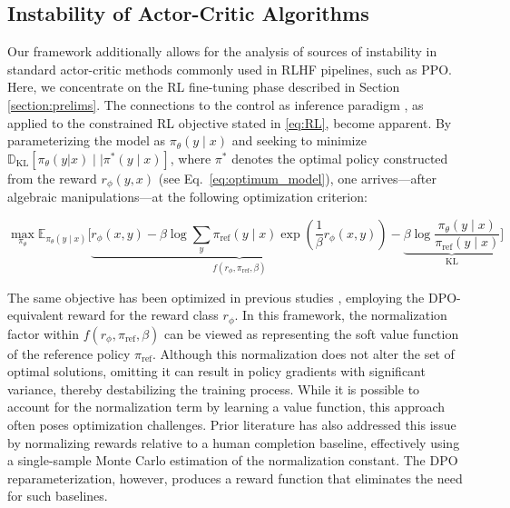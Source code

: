 \subsection{Instability of Actor-Critic Algorithms} Our framework additionally allows for the analysis of sources of instability in standard actor-critic methods commonly used in RLHF pipelines, such as PPO. Here, we concentrate on the RL fine-tuning phase described in Section \ref{section:prelims}. The connections to the control as inference paradigm \cite{levine2018reinforcement}, as applied to the constrained RL objective stated in \ref{eq:RL}, become apparent. By parameterizing the model as $\pi_{\theta}(y\mid x)$ and seeking to minimize $\mathbb{D}_{\text{KL}}[\pi_{\theta}(y|x) \mid \mid \pi^*(y\mid x)]$, where $\pi^*$ denotes the optimal policy constructed from the reward $r_{\phi}(y, x)$ (see Eq.~\ref{eq:optimum_model}), one arrives—after algebraic manipulations—at the following optimization criterion:

\begin{equation}\label{eq:AC}
    \max_{\pi_{\theta}}\mathbb{E}_{\pi_{\theta}(y\mid x)}\bigg[\underbrace{r_{\phi}(x, y) -\beta\log\sum_{y}\pi_\text{ref}(y\mid x)\exp\left(\frac{1}{\beta}r_{\phi}(x, y)\right)}_{f(r_{\phi}, \pi_\text{ref}, \beta)} - \underbrace{\beta\log\frac{\pi_{\theta}(y\mid x)}{\pi_\text{ref}(y\mid x)}}_{\text{KL}}\bigg]
\end{equation}

The same objective has been optimized in previous studies 
\citep{ziegler2020finetuning, stiennon2022learning, bai2022training, ouyang2022training}, employing the DPO-equivalent reward for the reward class $r_{\phi}$. In this framework, the normalization factor within $f(r_{\phi}, \pi_\text{ref}, \beta)$ can be viewed as representing the soft value function of the reference policy $\pi_\text{ref}$. Although this normalization does not alter the set of optimal solutions, omitting it can result in policy gradients with significant variance, thereby destabilizing the training process. While it is possible to account for the normalization term by learning a value function, this approach often poses optimization challenges. Prior literature has also addressed this issue by normalizing rewards relative to a human completion baseline, effectively using a single-sample Monte Carlo estimation of the normalization constant. The DPO reparameterization, however, produces a reward function that eliminates the need for such baselines.

